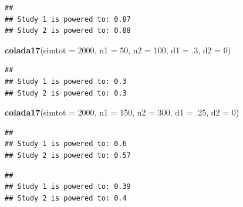 \documentclass[]{book}
\newenvironment{Shaded}{\begin{snugshade}}{\end{snugshade}}
\newcommand{\CommentTok}[1]{\textcolor[rgb]{0.56,0.35,0.01}{\textit{#1}}}
\newcommand{\DataTypeTok}[1]{\textcolor[rgb]{0.13,0.29,0.53}{#1}}
\newcommand{\DecValTok}[1]{\textcolor[rgb]{0.00,0.00,0.81}{#1}}
\newcommand{\FloatTok}[1]{\textcolor[rgb]{0.00,0.00,0.81}{#1}}
\newcommand{\KeywordTok}[1]{\textcolor[rgb]{0.13,0.29,0.53}{\textbf{#1}}}
\newcommand{\NormalTok}[1]{#1}
\newcommand{\OperatorTok}[1]{\textcolor[rgb]{0.81,0.36,0.00}{\textbf{#1}}}
\newcommand{\StringTok}[1]{\textcolor[rgb]{0.31,0.60,0.02}{#1}}
\begin{document}
\begin{verbatim}
## 
## Study 1 is powered to: 0.87
## Study 2 is powered to: 0.88
\end{verbatim}

\begin{Shaded}
\begin{Highlighting}[]
  \KeywordTok{colada17}\NormalTok{(}\DataTypeTok{simtot =} \DecValTok{2000}\NormalTok{, }\DataTypeTok{n1 =} \DecValTok{50}\NormalTok{, }\DataTypeTok{n2 =} \DecValTok{100}\NormalTok{, }\DataTypeTok{d1 =} \FloatTok{.3}\NormalTok{, }\DataTypeTok{d2 =} \DecValTok{0}\NormalTok{)}
\end{Highlighting}
\end{Shaded}

\begin{verbatim}
## 
## Study 1 is powered to: 0.3
## Study 2 is powered to: 0.3
\end{verbatim}

\begin{Shaded}
\begin{Highlighting}[]
  \KeywordTok{colada17}\NormalTok{(}\DataTypeTok{simtot =} \DecValTok{2000}\NormalTok{, }\DataTypeTok{n1 =} \DecValTok{150}\NormalTok{, }\DataTypeTok{n2 =} \DecValTok{300}\NormalTok{, }\DataTypeTok{d1 =} \FloatTok{.25}\NormalTok{, }\DataTypeTok{d2 =} \DecValTok{0}\NormalTok{)}
\end{Highlighting}
\end{Shaded}

\begin{verbatim}
## 
## Study 1 is powered to: 0.6
## Study 2 is powered to: 0.57
\end{verbatim}

\begin{Shaded}
\end{Shaded}

\begin{verbatim}
## 
## Study 1 is powered to: 0.39
## Study 2 is powered to: 0.4
\end{verbatim}
\end{document}
